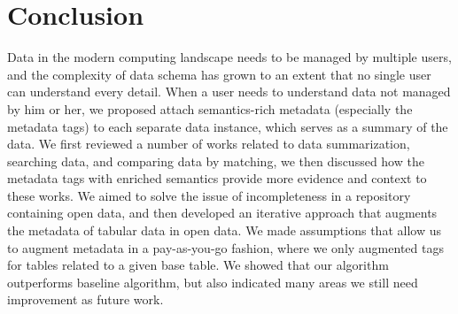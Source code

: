 
\chapter{Conclusion}
\label{ch:Conclusion}

Data in the modern computing landscape needs to be managed by multiple users, and the complexity of data schema has grown to an extent that no single user can understand every detail. When a user needs to understand data not managed by him or her, we proposed attach semantics-rich metadata (especially the metadata tags) to each separate data instance, which serves as a summary of the data. We first reviewed a number of works related to data summarization, searching data, and comparing data by matching, we then discussed how the metadata tags with enriched semantics provide more evidence and context to these works. We aimed to solve the issue of incompleteness in a repository containing open data, and then developed an iterative approach that augments the metadata of tabular data in open data. We made assumptions that allow us to augment metadata in a pay-as-you-go fashion, where we only augmented tags for tables related to a given base table. We showed that our algorithm outperforms baseline algorithm, but also indicated many areas we still need improvement as future work.

\endinput